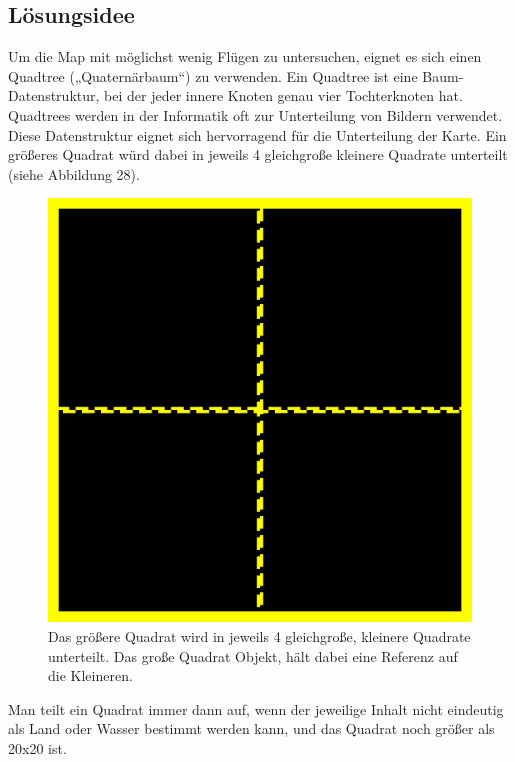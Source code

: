 \documentclass[a4paper,12pt]{article}
\begin{document}
\subsection{Lösungsidee}
Um die Map mit möglichst wenig Flügen zu untersuchen, eignet es sich einen Quadtree („Quaternärbaum“) \cite{quadtree} zu verwenden. Ein Quadtree ist eine Baum-Datenstruktur, bei der jeder innere Knoten genau vier Tochterknoten hat. Quadtrees werden in der Informatik oft zur Unterteilung von Bildern verwendet.
\\[0.4cm]
Diese Datenstruktur eignet sich hervorragend für die Unterteilung der Karte. Ein größeres Quadrat würd dabei in jeweils 4 gleichgroße kleinere Quadrate unterteilt (siehe Abbildung 28).
\begin{figure}[H]
\centering
    \includegraphics[width=0.5\linewidth]{Bilder/Aufgabe3/Quadtree_Einfach.png}
    \caption{Das größere Quadrat wird in jeweils 4 gleichgroße, kleinere Quadrate unterteilt. Das große Quadrat Objekt, hält dabei eine Referenz auf die Kleineren.}
\end{figure}

Man teilt ein Quadrat immer dann auf, wenn der jeweilige Inhalt nicht eindeutig als Land oder Wasser bestimmt werden kann, und das Quadrat noch größer als 20x20 ist.
\end{document}
